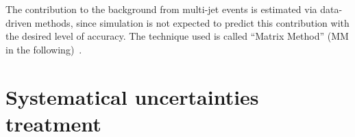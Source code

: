 The contribution to the background from multi-jet events is
estimated via data-driven methods, since
simulation is not expected to predict this contribution
with the desired level of accuracy.
The technique used is called ``Matrix Method'' (MM in the following)~\cite{ttbar_3pb}.  

%
%


\section{Systematical uncertainties treatment}
